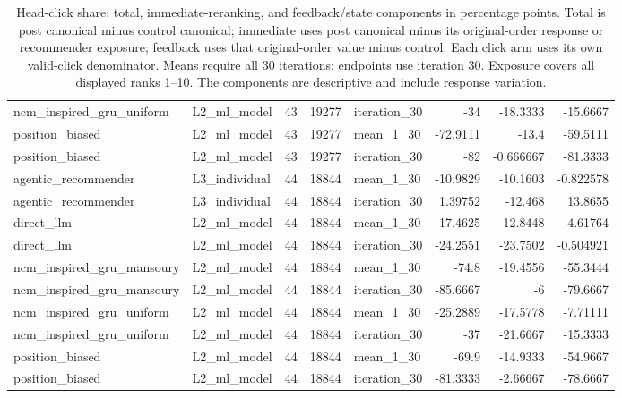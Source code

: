 \begin{table}[htbp!]
\begin{tabular}{llrrlrrr}
ncm\_inspired\_gru\_uniform & L2\_ml\_model & 43 & 19277 & iteration\_30 & -34 & -18.3333 & -15.6667 \\
position\_biased & L2\_ml\_model & 43 & 19277 & mean\_1\_30 & -72.9111 & -13.4 & -59.5111 \\
position\_biased & L2\_ml\_model & 43 & 19277 & iteration\_30 & -82 & -0.666667 & -81.3333 \\
agentic\_recommender & L3\_individual & 44 & 18844 & mean\_1\_30 & -10.9829 & -10.1603 & -0.822578 \\
agentic\_recommender & L3\_individual & 44 & 18844 & iteration\_30 & 1.39752 & -12.468 & 13.8655 \\
direct\_llm & L2\_ml\_model & 44 & 18844 & mean\_1\_30 & -17.4625 & -12.8448 & -4.61764 \\
direct\_llm & L2\_ml\_model & 44 & 18844 & iteration\_30 & -24.2551 & -23.7502 & -0.504921 \\
ncm\_inspired\_gru\_mansoury & L2\_ml\_model & 44 & 18844 & mean\_1\_30 & -74.8 & -19.4556 & -55.3444 \\
ncm\_inspired\_gru\_mansoury & L2\_ml\_model & 44 & 18844 & iteration\_30 & -85.6667 & -6 & -79.6667 \\
ncm\_inspired\_gru\_uniform & L2\_ml\_model & 44 & 18844 & mean\_1\_30 & -25.2889 & -17.5778 & -7.71111 \\
ncm\_inspired\_gru\_uniform & L2\_ml\_model & 44 & 18844 & iteration\_30 & -37 & -21.6667 & -15.3333 \\
position\_biased & L2\_ml\_model & 44 & 18844 & mean\_1\_30 & -69.9 & -14.9333 & -54.9667 \\
position\_biased & L2\_ml\_model & 44 & 18844 & iteration\_30 & -81.3333 & -2.66667 & -78.6667 \\
\hline
\end{tabular}
\caption{Head-click share: total, immediate-reranking, and feedback/state components in percentage points. Total is post canonical minus control canonical; immediate uses post canonical minus its original-order response or recommender exposure; feedback uses that original-order value minus control. Each click arm uses its own valid-click denominator. Means require all 30 iterations; endpoints use iteration 30. Exposure covers all displayed ranks 1--10. The components are descriptive and include response variation.}
\label{chap:results:tab:rq4_post_processing_head_click_share_components}
\end{table}
